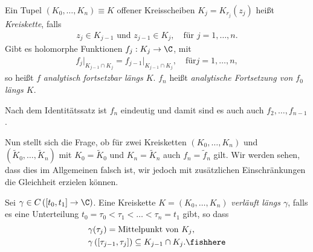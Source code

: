 \begin{defn}
\label{defn:2.66}
Ein Tupel $(K_0,\ldots,K_n)\equiv K$ offener Kreisscheiben $K_j = K_{r_j}(z_j)$
heißt \emph{Kreiskette}, falls
\begin{align*}
z_j\in K_{j-1} \text{ und } z_{j-1}\in K_j,\quad\text{für }j=1,\ldots,n.
\end{align*}
Gibt es holomorphe Funktionen $f_j: K_j\to\C$, mit
\begin{align*}
f_j\big|_{K_{j-1}\cap K_j} = f_{j-1}\big|_{K_{j-1}\cap K_j},\quad\text{für
}j=1,\ldots,n,
\end{align*}
so heißt $f$ \emph{analytisch fortsetzbar längs $K$}. $f_n$ heißt
\emph{analytische Fortsetzung von $f_0$ längs $K$}.\fishhere
\end{defn}

\begin{bem}
\label{bem:2.67}
Nach dem Identitätssatz ist $f_n$ eindeutig und damit sind es auch auch
$f_2,\ldots,f_{n-1}$.\maphere
\end{bem}

Nun stellt sich die Frage, ob für zwei Kreisketten $(K_0,\ldots,K_n)$ und
$(\tilde{K}_0,\ldots,\tilde{K}_n)$ mit $K_0 = \tilde{K}_0$ und $K_n =
\tilde{K}_n$ auch $f_n = \tilde{f}_n$ gilt. Wir werden sehen, dass dies im
Allgemeinen falsch ist, wir jedoch mit zusätzlichen Einschränkungen die
Gleichheit erzielen können.

\begin{defn}
\label{defn:2.68}
Sei $\gamma\in C\left([t_0,t_1]\to\C \right)$. Eine Kreiskette
$K=(K_0,\ldots,K_n)$ \emph{verläuft längs $\gamma$}, falls es eine Unterteilung
$t_0=\tau_0<\tau_1<\ldots<\tau_n=t_1$ gibt, so dass
\begin{align*}
&\gamma(\tau_j) = \text{Mittelpunkt von }K_j,\\
&\gamma\left([\tau_{j-1},\tau_j]\right)\subseteq K_{j-1}\cap K_j.\fishhere
\end{align*}
\end{defn}

